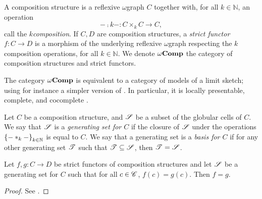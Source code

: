 \begin{dfn} 
    A composition structure is a reflexive \( \omega \)\nbd graph \( C \) together with, for all \( k \in \mathbb{N} \), an operation
    \begin{equation*}
        - \comp{k} - \colon C \times_k C \to C,
    \end{equation*}
    call the \emph{\( k \)\nbd composition}.
    If \( C, D \) are composition structures, a \emph{strict functor} \( f \colon C \to D \) is a morphism of the underlying reflexive  \( \omega \)\nbd graph respecting the \( k \)\nbd composition operations, for all \( k \in \mathbb{N} \).
    We denote \( \omega\mathbf{Comp} \) the category of composition structures and strict functors.
\end{dfn}

\begin{rmk}
    The category \( \omega\mathbf{Comp} \) is equivalent to a category of models of a limit sketch; using for instance a simpler version of \cite[Proposition 14.2.4]{ara2025polygraphs}.
    In particular, it is locally presentable, complete, and cocomplete \cite{adamek1994locally}.
\end{rmk}

\begin{dfn} 
    Let \( C \) be a composition structure, and \( \mathscr{S} \) be a subset of the globular cells of \( C \).
    We say that \( \mathscr{S} \) is a \emph{generating set for \( C \)} if the closure of \( \mathscr{S} \) under the operations \( \left\{ {- *_{k} -} \right\}_{k \in \mathbb{N}} \) is equal to \( C \).
    We say that a generating set is a \emph{basis for \( C \)} if for any other generating set \( \mathscr{T} \) such that \( \mathscr{T} \subseteq \mathscr{S} \), then \( \mathscr{T} = \mathscr{S} \).
\end{dfn}

\begin{lem}\label{lem:strict_functor_determined_by_basis}
    Let \( f, g \colon C \to D \) be strict functors of composition structures and let \( \mathscr{S} \) be a generating set for \( C \) such that for all \( c \in \mathscr{C} \), \( f(c) = g(c) \).
    Then \( f = g \).
\end{lem}
\begin{proof}
    See \cite[Lemma 5.1.23]{hadzihasanovic2024combinatorics}.
\end{proof}

